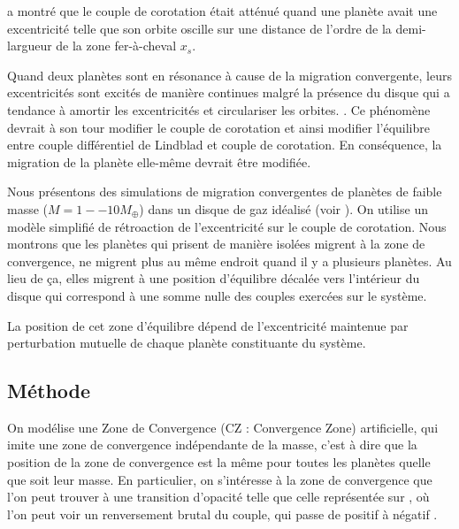 \bigskip

\cite{bitsch2010orbital} a montré que le couple de corotation était atténué quand une planète avait une excentricité telle que son orbite oscille sur une distance de l'ordre de la demi-largueur de la zone fer-à-cheval $x_s$. 

Quand deux planètes sont en résonance à cause de la migration convergente, leurs excentricités sont excités de manière continues malgré la présence du disque qui a tendance à amortir les excentricités et circulariser les orbites. \citep[par exemple ][]{cresswell2008three}. Ce phénomène devrait à son tour modifier le couple de corotation et ainsi modifier l'équilibre entre couple différentiel de Lindblad et couple de corotation. En conséquence, la migration de la planète elle-même devrait être modifiée.

\bigskip

Nous présentons des simulations de migration convergentes de planètes de faible masse ($M=1--10\unit{M_\oplus}$) dans un disque de gaz idéalisé (voir ). On utilise un modèle simplifié de rétroaction de l'excentricité sur le couple de corotation. Nous montrons que les planètes qui prisent de manière isolées migrent à la zone de convergence, ne migrent plus au même endroit quand il y a plusieurs planètes. Au lieu de ça, elles migrent à une position d'équilibre décalée vers l'intérieur du disque qui correspond à une somme nulle des couples exercées sur le système. 

La position de cet zone d'équilibre dépend de l'excentricité maintenue par perturbation mutuelle de chaque planète constituante du système.

\subsection{Méthode}
On modélise une Zone de Convergence (CZ : Convergence Zone) artificielle, qui imite une zone de convergence indépendante de la masse, c'est à dire que la position de la zone de convergence est la même pour toutes les planètes quelle que soit leur masse. En particulier, on s'intéresse à la zone de convergence que l'on peut trouver à une transition d'opacité telle que celle représentée sur , où l'on peut voir un renversement brutal du couple, qui passe de positif à négatif \citep[voir par exemple ][]{masset2011type}.

